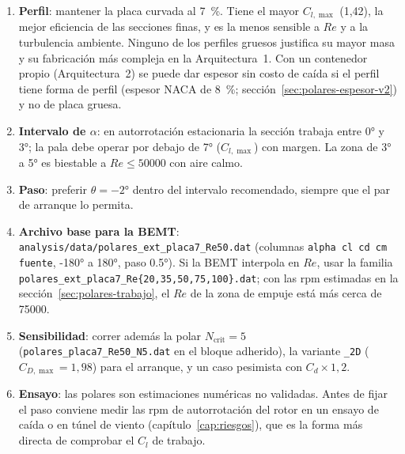\begin{resultado}
\begin{enumerate}
  \item \textbf{Perfil}: mantener la placa curvada al \SI{7}{\percent}. Tiene el mayor
        $C_{l,\max}$ (1,42), la mejor eficiencia de las secciones finas, y es la menos
        sensible a $Re$ y a la turbulencia ambiente. Ninguno de los perfiles gruesos
        justifica su mayor masa y su fabricación más compleja en la Arquitectura~1. Con un
        contenedor propio (Arquitectura~2) se puede dar espesor sin costo de caída si el perfil
        tiene forma de perfil (espesor NACA de \SI{8}{\percent}; sección~\ref{sec:polares-espesor-v2}) y no de placa gruesa.
  \item \textbf{Intervalo de $\alpha$}: en autorrotación estacionaria la sección trabaja
        entre \ang{0} y \ang{3}; la pala debe operar por debajo de \ang{7}
        ($C_{l,\max}$) con margen. La zona de \ang{3} a \ang{5} es biestable a
        $Re\le\num{50000}$ con aire calmo.
  \item \textbf{Paso}: preferir $\theta=\ang{-2}$ dentro del intervalo recomendado,
        siempre que el par de arranque lo permita.
  \item \textbf{Archivo base para la BEMT}:
        \texttt{analysis/data/polares\_ext\_placa7\_Re50.dat} (columnas \texttt{alpha cl
        cd cm fuente}, \ang{-180} a \ang{180}, paso \ang{0.5}). Si la BEMT interpola en
        $Re$, usar la familia \texttt{polares\_ext\_placa7\_Re\{20,35,50,75,100\}.dat};
        con las rpm estimadas en la sección~\ref{sec:polares-trabajo}, el $Re$ de la
        zona de empuje está más cerca de \num{75000}.
  \item \textbf{Sensibilidad}: correr además la polar $N_{\text{crit}}=5$
        (\texttt{polares\_placa7\_Re50\_N5.dat} en el bloque adherido), la variante
        \texttt{\_2D} ($C_{D,\max}=1{,}98$) para el arranque, y un caso pesimista con
        $C_d\times1{,}2$.
  \item \textbf{Ensayo}: las polares son estimaciones numéricas no validadas. Antes de
        fijar el paso conviene medir las rpm de autorrotación del rotor en un ensayo
        de caída o en túnel de viento (capítulo~\ref{cap:riesgos}), que es la
        forma más directa de comprobar el $C_l$ de trabajo.
\end{enumerate}
\end{resultado}
